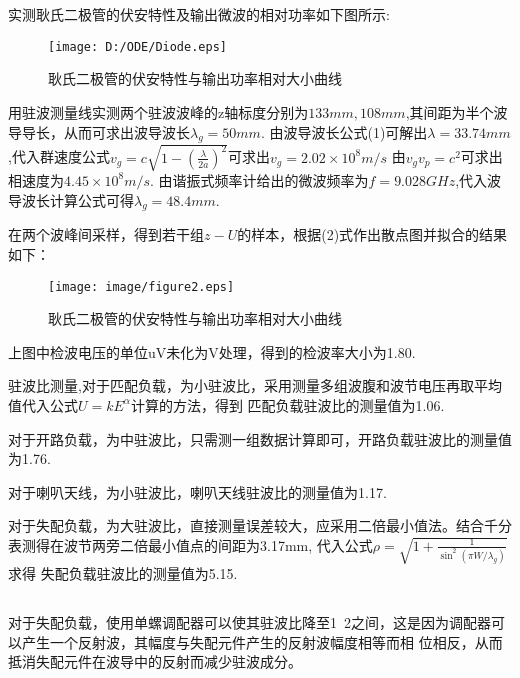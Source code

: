 ﻿\documentclass[10.5pt]{article}
\begin{document}
\section{\textbf{}}
\subsection{\textbf{}}
实测耿氏二极管的伏安特性及输出微波的相对功率如下图所示:\newpage
\begin{figure}[!ht]
\centering
\caption{耿氏二极管的伏安特性与输出功率相对大小曲线}
\texttt{[image: D:/ODE/Diode.eps]}
\end{figure}


用驻波测量线实测两个驻波波峰的z轴标度分别为$133mm,108mm$,其间距为半个波导导长，从而可求出波导波长$\lambda_g=50mm$.
由波导波长公式(1)可解出$\lambda=33.74mm$,代入群速度公式$v_g=c \sqrt{1-(\frac{\lambda}{2a})^2}$可求出$v_g=2.02\times 10^8 m/s$
由$v_g v_p=c^2$可求出相速度为$4.45\times 10^8 m/s$.
由谐振式频率计给出的微波频率为$f=9.028GHz$,代入波导波长计算公式可得$\lambda_g=48.4mm$.


在两个波峰间采样，得到若干组$z - U$的样本，根据(2)式作出散点图并拟合的结果如下：
\begin{figure}[!ht]
\centering
\caption{耿氏二极管的伏安特性与输出功率相对大小曲线}
\texttt{[image: image/figure2.eps]}
\end{figure}


上图中检波电压的单位uV未化为V处理，得到的检波率大小为1.80.\newline


驻波比测量,对于匹配负载，为小驻波比，采用测量多组波腹和波节电压再取平均值代入公式$U=k E^{\alpha}$计算的方法，得到
匹配负载驻波比的测量值为1.06.

对于开路负载，为中驻波比，只需测一组数据计算即可，开路负载驻波比的测量值为1.76.

对于喇叭天线，为小驻波比，喇叭天线驻波比的测量值为1.17.

对于失配负载，为大驻波比，直接测量误差较大，应采用二倍最小值法。结合千分表测得在波节两旁二倍最小值点的间距为3.17mm,
代入公式$\rho=\sqrt{1+\frac{1}{\sin^2(\pi W/\lambda_g)}}$求得 失配负载驻波比的测量值为5.15.



\subsection{\textbf{}}
对于失配负载，使用单螺调配器可以使其驻波比降至1~2之间，这是因为调配器可以产生一个反射波，其幅度与失配元件产生的反射波幅度相等而相
位相反，从而抵消失配元件在波导中的反射而减少驻波成分。
\end{document}
